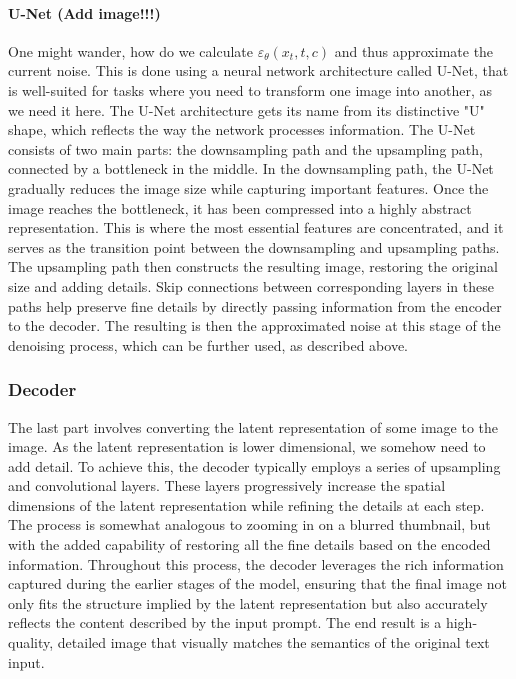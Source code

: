 \documentclass[11pt]{article}
\begin{document}
\paragraph{U-Net (Add image!!!)}
One might wander, how do we calculate $\varepsilon_\theta(x_t,t,c)$ and thus approximate the current noise. This is done using a neural network architecture called U-Net\cite{ronneberger2015unetconvolutionalnetworksbiomedical}, that is well-suited for tasks where you need to transform one image into another, as we need it here.
The U-Net architecture gets its name from its distinctive "U" shape, which reflects the way the network processes information. The U-Net consists of two main parts: the downsampling path  and the upsampling path, connected by a bottleneck in the middle.
In the downsampling path, the U-Net gradually reduces the image size while capturing important features. Once the image reaches the bottleneck, it has been compressed into a highly abstract representation. This is where the most essential features are concentrated, and it serves as the transition point between the downsampling and upsampling paths. The upsampling path then constructs the resulting image, restoring the original size and adding details. Skip connections between corresponding layers in these paths help preserve fine details by directly passing information from the encoder to the decoder.
The resulting is then the approximated noise at this stage of the denoising process, which can be further used, as described above.

\subsubsection{Decoder}
The last part involves converting the latent representation of some image to the image. As the latent representation is lower dimensional, we somehow need to add detail. To achieve this, the decoder typically employs a series of upsampling and convolutional layers. These layers progressively increase the spatial dimensions of the latent representation while refining the details at each step. The process is somewhat analogous to zooming in on a blurred thumbnail, but with the added capability of restoring all the fine details based on the encoded information.
Throughout this process, the decoder leverages the rich information captured during the earlier stages of the model, ensuring that the final image not only fits the structure implied by the latent representation but also accurately reflects the content described by the input prompt. The end result is a high-quality, detailed image that visually matches the semantics of the original text input.
\end{document}
